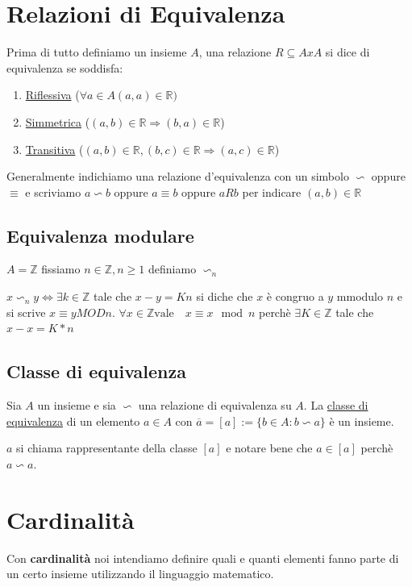 \documentclass{article}
\theoremstyle{definition}
\begin{document}
\section{Relazioni di Equivalenza}
Prima di tutto definiamo un insieme $A$, una relazione $R \subseteq AxA$ si dice di equivalenza se soddisfa:
\begin{enumerate}
        \item \underline{Riflessiva} ($\forall a \in A (a,a) \in \mathbb{R})$
        \item \underline{Simmetrica} ($(a,b) \in \mathbb{R} \Rightarrow (b,a) \in \mathbb{R}$)
        \item \underline{Transitiva} ($(a,b) \in \mathbb{R},(b,c) \in \mathbb{R} \Rightarrow (a,c) \in \mathbb{R}$)
\end{enumerate}

Generalmente indichiamo una relazione d'equivalenza con un simbolo  $\backsim$ oppure $\equiv$ e scriviamo $a \backsim b$ oppure $a \equiv b$ oppure $aRb$ per indicare $(a,b) \in \mathbb{R}$



\subsection{Equivalenza modulare}
$A = \mathbb{Z}$ fissiamo $n \in \mathbb{Z}, n \geq 1$ definiamo $\backsim_n$ \par
$x \backsim_n y \Leftrightarrow \exists k \in \mathbb{Z}$ tale che $x-y = Kn$ si diche che $x$ è congruo a $y$ mmodulo $n$ e si scrive $x \equiv y MOD n$.
$\forall x \in \mathbb{Z} \mbox{vale} \quad x \equiv x \mod n$ perchè $\exists K \in \mathbb{Z}$ tale che $x-x = K*n$ 



\subsection{Classe di equivalenza}
Sia $A$ un insieme e sia $\backsim$ una relazione di equivalenza su $A$. La \underline{classe di equivalenza} di un elemento $a \in A$ con $\overline{a} = [a] := \{b\in A : b \backsim a\}$ è un insieme. \par
$a$ si chiama rappresentante della classe $[a]$ e notare bene che $a \in [a]$ perchè $a \backsim a$.






\newpage
\section{Cardinalità}
Con \textbf{cardinalità} noi intendiamo definire quali e quanti elementi fanno parte di un certo insieme utilizzando il linguaggio matematico. \par
\end{document}
